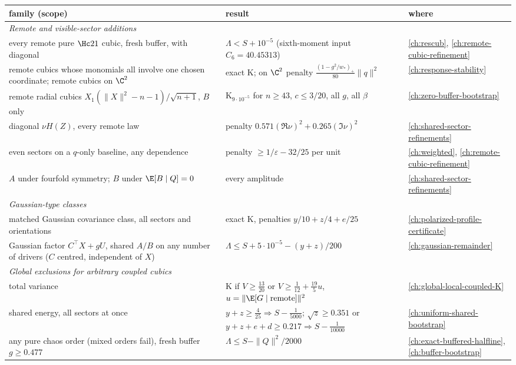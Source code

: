 \begin{center}\small
\begin{tabular}{p{6.4cm}p{5.2cm}p{2.4cm}}\toprule
family (scope) & result & where\\\midrule
\multicolumn{3}{l}{\emph{Remote and visible-sector additions}}\\
every remote pure $\Hc21$ cubic, fresh buffer, with diagonal & $\Lambda<S+10^{-5}$ (sixth-moment input $C_6=40.45313$) & \autoref{ch:rescub}, \autoref{ch:remote-cubic-refinement}\\
remote cubics whose monomials all involve one chosen coordinate; remote cubics on $\C^2$ & exact K; on $\C^2$ penalty $\frac{(1-g^2/w_*)_+}{80}\|q\|^2$ & \autoref{ch:response-stability}\\
remote radial cubics $X_1(\|X\|^2-n-1)/\sqrt{n+1}$, $B$ only & K$_{9\cdot10^{-5}}$ for $n\ge43$, $c\le3/20$, all $g$, all $\beta$ & \autoref{ch:zero-buffer-bootstrap}\\
diagonal $\nu H(Z)$, every remote law & penalty $0.571(\Re\nu)^2+0.265(\Im\nu)^2$ & \autoref{ch:shared-sector-refinements}\\
even sectors on a $q$-only baseline, any dependence & penalty $\ge1/\varepsilon-32/25$ per unit & \autoref{ch:weighted}, \autoref{ch:remote-cubic-refinement}\\
$A$ under fourfold symmetry; $B$ under $\E[B\mid Q]=0$ & every amplitude & \autoref{ch:shared-sector-refinements}\\
\multicolumn{3}{l}{\emph{Gaussian-type classes}}\\
matched Gaussian covariance class, all sectors and orientations & exact K, penalties $y/10+z/4+e/25$ & \autoref{ch:polarized-profile-certificate}\\
Gaussian factor $C^{\!\top}\!X+gU$, shared $A/B$ on any number of drivers ($C$ centred, independent of $X$) & $\Lambda\le S+5\cdot10^{-5}-(y+z)/200$ & \autoref{ch:gaussian-remainder}\\
\multicolumn{3}{l}{\emph{Global exclusions for arbitrary coupled cubics}}\\
total variance & K if $V\ge\frac{13}{20}$ or $V\ge\frac1{12}+\frac{19}5u$, $u=\|\E[G\mid\text{remote}]\|^2$ & \autoref{ch:global-local-coupled-K}\\
shared energy, all sectors at once & $y+z\ge\frac4{25}\Rightarrow S-\frac1{5000}$; $\sqrt z\ge0.351$ or $y+z+e+d\ge0.217\Rightarrow S-\frac1{10000}$ & \autoref{ch:uniform-shared-bootstrap}\\
any pure chaos order (mixed orders fail), fresh buffer $g\ge0.477$ & $\Lambda\le S-\|Q\|^2/2000$ & \autoref{ch:exact-buffered-halfline}, \autoref{ch:buffer-bootstrap}\\

\end{tabular}
\end{center}
